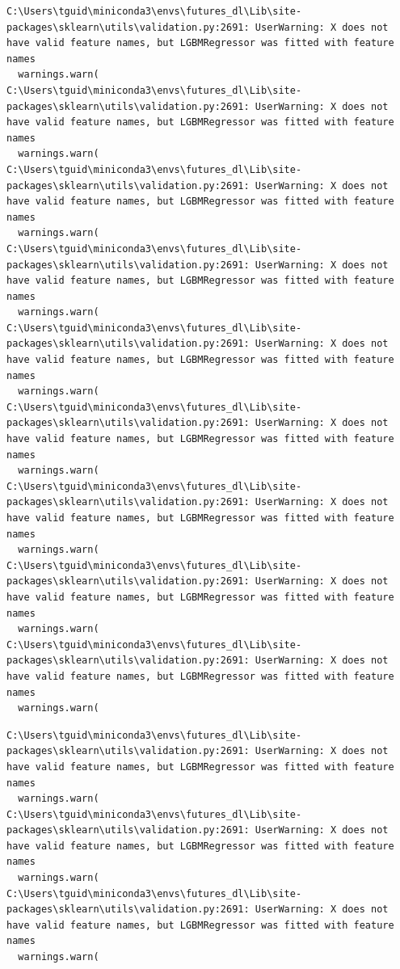 \begin{verbatim}
C:\Users\tguid\miniconda3\envs\futures_dl\Lib\site-packages\sklearn\utils\validation.py:2691: UserWarning: X does not have valid feature names, but LGBMRegressor was fitted with feature names
  warnings.warn(
C:\Users\tguid\miniconda3\envs\futures_dl\Lib\site-packages\sklearn\utils\validation.py:2691: UserWarning: X does not have valid feature names, but LGBMRegressor was fitted with feature names
  warnings.warn(
C:\Users\tguid\miniconda3\envs\futures_dl\Lib\site-packages\sklearn\utils\validation.py:2691: UserWarning: X does not have valid feature names, but LGBMRegressor was fitted with feature names
  warnings.warn(
C:\Users\tguid\miniconda3\envs\futures_dl\Lib\site-packages\sklearn\utils\validation.py:2691: UserWarning: X does not have valid feature names, but LGBMRegressor was fitted with feature names
  warnings.warn(
C:\Users\tguid\miniconda3\envs\futures_dl\Lib\site-packages\sklearn\utils\validation.py:2691: UserWarning: X does not have valid feature names, but LGBMRegressor was fitted with feature names
  warnings.warn(
C:\Users\tguid\miniconda3\envs\futures_dl\Lib\site-packages\sklearn\utils\validation.py:2691: UserWarning: X does not have valid feature names, but LGBMRegressor was fitted with feature names
  warnings.warn(
C:\Users\tguid\miniconda3\envs\futures_dl\Lib\site-packages\sklearn\utils\validation.py:2691: UserWarning: X does not have valid feature names, but LGBMRegressor was fitted with feature names
  warnings.warn(
C:\Users\tguid\miniconda3\envs\futures_dl\Lib\site-packages\sklearn\utils\validation.py:2691: UserWarning: X does not have valid feature names, but LGBMRegressor was fitted with feature names
  warnings.warn(
C:\Users\tguid\miniconda3\envs\futures_dl\Lib\site-packages\sklearn\utils\validation.py:2691: UserWarning: X does not have valid feature names, but LGBMRegressor was fitted with feature names
  warnings.warn(
\end{verbatim}

\begin{verbatim}
C:\Users\tguid\miniconda3\envs\futures_dl\Lib\site-packages\sklearn\utils\validation.py:2691: UserWarning: X does not have valid feature names, but LGBMRegressor was fitted with feature names
  warnings.warn(
C:\Users\tguid\miniconda3\envs\futures_dl\Lib\site-packages\sklearn\utils\validation.py:2691: UserWarning: X does not have valid feature names, but LGBMRegressor was fitted with feature names
  warnings.warn(
C:\Users\tguid\miniconda3\envs\futures_dl\Lib\site-packages\sklearn\utils\validation.py:2691: UserWarning: X does not have valid feature names, but LGBMRegressor was fitted with feature names
  warnings.warn(
\end{verbatim}

